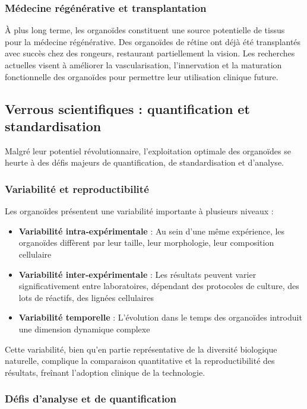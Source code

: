 \subsubsection{Médecine régénérative et transplantation}

À plus long terme, les organoïdes constituent une source potentielle de tissus pour la médecine régénérative. Des organoïdes de rétine ont déjà été transplantés avec succès chez des rongeurs, restaurant partiellement la vision. Les recherches actuelles visent à améliorer la vascularisation, l'innervation et la maturation fonctionnelle des organoïdes pour permettre leur utilisation clinique future.

\subsection{Verrous scientifiques : quantification et standardisation}

Malgré leur potentiel révolutionnaire, l'exploitation optimale des organoïdes se heurte à des défis majeurs de quantification, de standardisation et d'analyse.

\subsubsection{Variabilité et reproductibilité}

Les organoïdes présentent une variabilité importante à plusieurs niveaux :
\begin{itemize}
    \item \textbf{Variabilité intra-expérimentale} : Au sein d'une même expérience, les organoïdes diffèrent par leur taille, leur morphologie, leur composition cellulaire
    \item \textbf{Variabilité inter-expérimentale} : Les résultats peuvent varier significativement entre laboratoires, dépendant des protocoles de culture, des lots de réactifs, des lignées cellulaires
    \item \textbf{Variabilité temporelle} : L'évolution dans le temps des organoïdes introduit une dimension dynamique complexe
\end{itemize}

Cette variabilité, bien qu'en partie représentative de la diversité biologique naturelle, complique la comparaison quantitative et la reproductibilité des résultats, freînant l'adoption clinique de la technologie.

\subsubsection{Défis d'analyse et de quantification}

